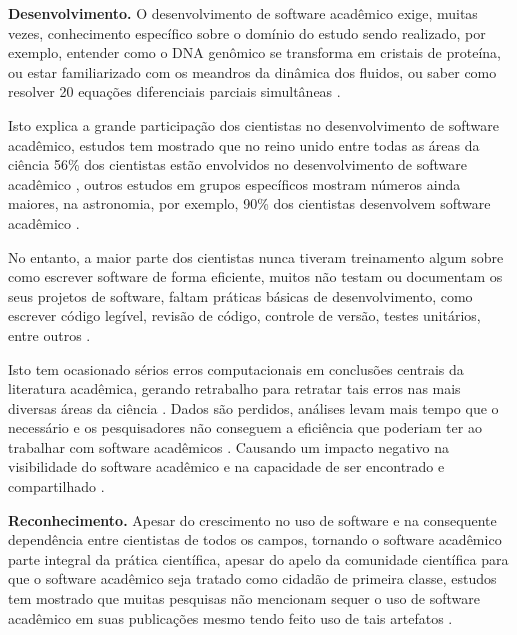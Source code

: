 \vspace*{0.25cm}

\noindent \textbf{Desenvolvimento.}
O desenvolvimento de software acadêmico exige, muitas vezes, conhecimento
específico sobre o domínio do estudo sendo realizado,
por exemplo, entender como o DNA genômico
se transforma em cristais de proteína, ou estar familiarizado com os meandros
da dinâmica dos fluidos, ou saber como resolver 20 equações diferenciais
parciais simultâneas \cite{segal2008developing}.

Isto explica a grande participação dos cientistas no desenvolvimento de
software acadêmico, estudos tem mostrado que no reino unido entre todas as
áreas da ciência 56\% dos cientistas estão envolvidos no desenvolvimento de
software acadêmico \cite{hettrick2014uk}, outros estudos em grupos específicos mostram números ainda
maiores, na astronomia, por exemplo, 90\% dos cientistas desenvolvem software
acadêmico \cite{momcheva2015software}.

No entanto, a maior parte dos cientistas nunca tiveram treinamento algum sobre como escrever
software de forma eficiente, muitos não testam ou documentam os seus projetos de
software, faltam práticas básicas de desenvolvimento, como escrever código
legível, revisão de código, controle de versão, testes unitários, entre outros
\cite{wilson2017good}.

Isto tem ocasionado sérios erros computacionais em conclusões centrais da
literatura acadêmica, gerando retrabalho para retratar tais erros nas mais
diversas áreas da ciência \cite{merali2010computational}.
Dados são perdidos, análises levam mais tempo que o necessário e os
pesquisadores não conseguem a eficiência que poderiam ter ao trabalhar com
software acadêmicos \cite{wilson2017good}.
Causando um impacto negativo na visibilidade do software acadêmico e na
capacidade de ser encontrado e compartilhado \cite{howison2013incentives,
katz2014transitive}.

\vspace*{0.25cm}

\noindent \textbf{Reconhecimento.}
Apesar do crescimento no uso de software e na consequente dependência entre
cientistas de todos os campos, tornando o software acadêmico parte integral da
prática científica, apesar do apelo da comunidade científica para que o
software acadêmico seja tratado como cidadão de primeira classe, estudos tem
mostrado que muitas pesquisas não mencionam sequer o uso de software acadêmico
em suas publicações mesmo tendo feito uso de tais artefatos
\cite{momcheva2015software} \cite{howison2016software}.

